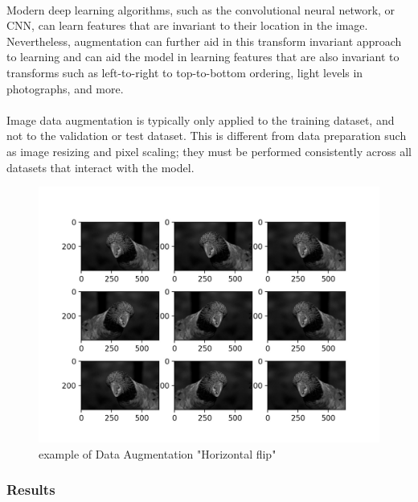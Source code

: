 \paragraph{}
Modern deep learning algorithms, such as the convolutional neural network, or CNN, can learn features that are invariant to their location in the image. Nevertheless, augmentation can further aid in this transform invariant approach to learning and can aid the model in learning features that are also invariant to transforms such as left-to-right to top-to-bottom ordering, light levels in photographs, and more.
\paragraph{}
Image data augmentation is typically only applied to the training dataset, and not to the validation or test dataset. This is different from data preparation such as image resizing and pixel scaling; they must be performed consistently across all datasets that interact with the model.
\begin{figure}
	\centering
	\includegraphics[width=1\textwidth]{data_aug.jpg}
	\caption{example of Data Augmentation "Horizontal flip"}
\end{figure} 
\subsubsection{Results}

